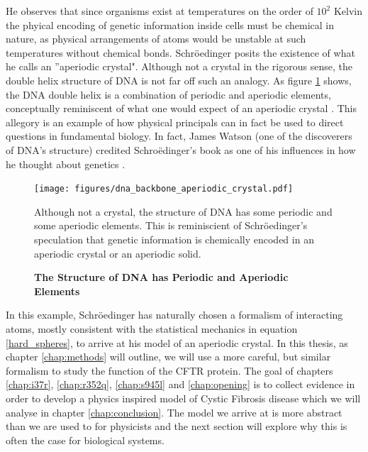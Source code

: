 He observes that since organisms exist at temperatures on the order of $10^2 $ Kelvin the phyical encoding of genetic information inside cells must be chemical in nature, as physical arrangements of atoms would be unstable at such temperatures without chemical bonds. Schr\"oedinger posits the existence of what he calls an ''aperiodic crystal". Although not a crystal in the rigorous sense, the double helix structure of DNA is not far off such an analogy. As figure \ref{dna_structure} shows, the DNA double helix is a combination of periodic and aperiodic elements, conceptually reminiscent of what one would expect of an aperiodic crystal \cite{varn2016}. This allegory is an example of how physical principals can in fact be used to direct questions in fundamental biology. In fact, James Watson (one of the discoverers of DNA's structure) credited Schro\"edinger's book as one of his influences in how he thought about genetics \cite{watson2010}.

\begin{figure}
	\begin{center}
		\texttt{[image: figures/dna\_backbone\_aperiodic\_crystal.pdf]}
	\end{center}
	\captionsetup{singlelinecheck = false, justification=raggedright}
	\caption[The Structure of DNA has Periodic and Aperiodic Elements] {\textbf{The Structure of DNA has Periodic and Aperiodic Elements}}{Although not a crystal, the structure of DNA has some periodic and some aperiodic elements. This is reminiscient of Schr\"oedinger's speculation that genetic information is chemically encoded in an aperiodic crystal or an aperiodic solid. }
	\label{dna_structure}
\end{figure}

In this example, Schr\"oedinger has naturally chosen a formalism of interacting atoms, mostly consistent with the statistical mechanics in equation \ref{hard_spheres}, to arrive at his model of an aperiodic crystal. In this thesis, as chapter \ref{chap:methods} will outline, we will use a more careful, but similar formalism to study the function of the CFTR protein. The goal of chapters \ref{chap:i37r}, \ref{chap:r352q}, \ref{chap:s945l} and \ref{chap:opening} is to collect evidence in order to develop a physics inspired model of Cystic Fibrosis disease which we will analyse in chapter \ref{chap:conclusion}. The model we arrive at is more abstract than we are used to for physicists and the next section will explore why this is often the case for biological systems.
 
